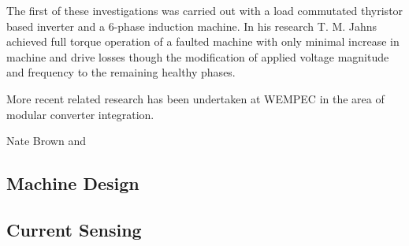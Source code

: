 The first of these investigations was carried out with a load commutated
thyristor based inverter and a 6-phase induction machine.
In his research \cite{Jahns78} T. M. Jahns achieved full torque operation of a faulted
machine with only minimal increase in machine and drive losses though the
modification of applied voltage magnitude and frequency to the remaining
healthy phases.

More recent related research has been undertaken at WEMPEC in the area of
modular converter integration.

Nate Brown and 


\subsection{Machine Design}

\subsection{Current Sensing}

